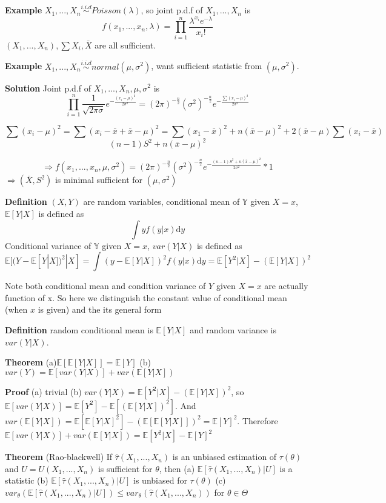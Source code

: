 \documentclass[a4paper,12pt]{article}
\begin{document}
\textbf{Example} $X_1, ..., X_n \overset{i.i.d}{\sim} Poisson(\lambda)$, so joint p.d.f of $X_1, ..., X_n$ is
$$f(x_1, ..., x_n, \lambda) = \prod_{i=1}^n \frac{\lambda^{x_i} e^{-\lambda}}{x_i!}$$
$(X_1, ..., X_n), \sum X_i, \bar{X}$ are all sufficient. 

\textbf{Example} $X_1, ..., X_n \overset{i.i.d}{\sim} normal(\mu, \sigma^2)$, want sufficient statistic from $(\mu, \sigma^2)$. 

\textbf{Solution} Joint p.d.f of $X_1, ..., X_n, \mu, \sigma^2$ is
$$\prod_{i=1}^n \frac{1}{\sqrt{2\pi\sigma}}e^{-\frac{(x_i-\mu)^2}{2\sigma^2}} = (2\pi)^{-\frac{n}{2}}(\sigma^2)^{-\frac{n}{2}}e^{-\frac{\sum(x_i-\mu)^2}{2\sigma^2}}$$

$$\sum(x_i-\mu)^2 = \sum(x_i-\bar{x}+\bar{x}-\mu)^2 = \sum(x_1-\bar{x})^2 + n(\bar{x}-\mu)^2+2(\bar{x}-\mu)\sum(x_i-\bar{x})$$
$$(n-1)S^2+n(\bar{x}-\mu)^2$$

$$\Rightarrow f(x_1, ..., x_n, \mu, \sigma^2 ) = (2\pi)^{-\frac{n}{2}}(\sigma^2)^{-\frac{n}{2}}e^{-\frac{(n-1)S^2+n(\bar{x}-\mu)^2}{2\sigma^2}} * 1$$
$\Rightarrow (\bar{X}, S^2) $ is minimal sufficient for $ (\mu, \sigma^2) $ 

\textbf{Definition} $(X, Y)$ are random variables, conditional mean of $\mathbb{Y}$ given $X=x$, $\mathbb{E}[Y|X]$ is defined as
$$\int yf(y|x) \mathrm{d}y$$
Conditional variance of $\mathbb{Y}$ given $X=x$, $var(Y|X)$ is defined as
$$\mathbb{E}[ (Y - \mathbb{E}[Y|X])^2 |X ] = \int (y-\mathbb{E}[Y|X])^2 f(y|x) \mathrm{d}y = 
\mathbb{E}[ Y^2 |X ] - (\mathbb{E}[Y|X])^2$$

Note both conditional mean and condition variance of $Y$ given $X=x$ are actually function of x. So here we distinguish the constant value of conditional mean (when $x$ is given) and the its general form 

\textbf{Definition} random conditional mean is $\mathbb{E}[Y|X]$ and random variance is $var(Y|X)$. 

\textbf{Theorem} 
(a)$\mathbb{E}[\mathbb{E}[Y|X]] = \mathbb{E}[Y]$ 
(b)$var(Y) = \mathbb{E}[var(Y|X)]+var(\mathbb{E}[Y|X])$ 

\textbf{Proof} 
(a) trivial 
(b) $var(Y|X) = \mathbb{E}[ Y^2 |X ] - (\mathbb{E}[Y|X])^2$, so $\mathbb{E}[var(Y|X)] = \mathbb{E}[Y^2] - \mathbb{E}[(\mathbb{E}[Y|X])^2]$. And $var(\mathbb{E}[Y|X]) = \mathbb{E}[ \mathbb{E}[Y|X]^2 ] - (\mathbb{E}[\mathbb{E}[Y|X]])^2 = \mathbb{E}[Y]^2$. Therefore $\mathbb{E}[var(Y|X)]+var(\mathbb{E}[Y|X]) = \mathbb{E}[ Y^2 |X ] - \mathbb{E}[Y]^2$ 

\textbf{Theorem} (Rao-blackwell) If $\hat{\tau}(X_1, ..., X_n)$ is an unbiased estimation of $\tau(\theta)$ and $U = U(X_1, ..., X_n)$ is sufficient for $\theta$, then 
(a) $\mathbb{E}[ \hat{\tau}(X_1, ..., X_n) | U ]$ is a statistic 
(b) $\mathbb{E}[ \hat{\tau}(X_1, ..., X_n) | U ]$ is unbiased for $\tau(\theta)$ 
(c) $var_\theta( \mathbb{E}[ \hat{\tau}(X_1, ..., X_n) | U ] )\leq var_\theta( \hat{\tau}(X_1, ..., X_n) )$ for $\theta\in\Theta$ 
\end{document}
